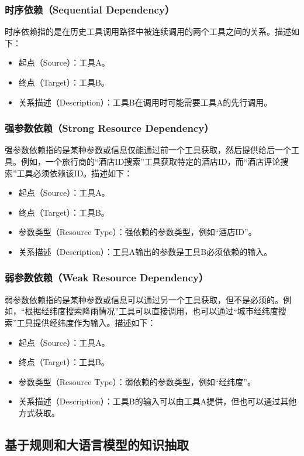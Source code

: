 \subsubsection{时序依赖（Sequential Dependency）}
时序依赖指的是在历史工具调用路径中被连续调用的两个工具之间的关系。描述如下：
\begin{itemize}
    \item 起点（Source）：工具A。
    \item 终点（Target）：工具B。
    \item 关系描述（Description）：工具B在调用时可能需要工具A的先行调用。
\end{itemize}

\subsubsection{强参数依赖（Strong Resource Dependency）}
强参数依赖指的是某种参数或信息仅能通过前一个工具获取，然后提供给后一个工具。例如，一个旅行商的“酒店ID搜索”工具获取特定的酒店ID，而“酒店评论搜索”工具必须依赖该ID。描述如下：
\begin{itemize}
    \item 起点（Source）：工具A。
    \item 终点（Target）：工具B。
    \item 参数类型（Resource Type）：强依赖的参数类型，例如``酒店ID''。
    \item 关系描述（Description）：工具A输出的参数是工具B必须依赖的输入。
\end{itemize}

\subsubsection{弱参数依赖（Weak Resource Dependency）}
弱参数依赖指的是某种参数或信息可以通过另一个工具获取，但不是必须的。例如，“根据经纬度搜索降雨情况”工具可以直接调用，也可以通过“城市经纬度搜索”工具提供经纬度作为输入。描述如下：
\begin{itemize}
    \item 起点（Source）：工具A。
    \item 终点（Target）：工具B。
    \item 参数类型（Resource Type）：弱依赖的参数类型，例如``经纬度''。
    \item 关系描述（Description）：工具B的输入可以由工具A提供，但也可以通过其他方式获取。
\end{itemize}

\subsection{基于规则和大语言模型的知识抽取}

